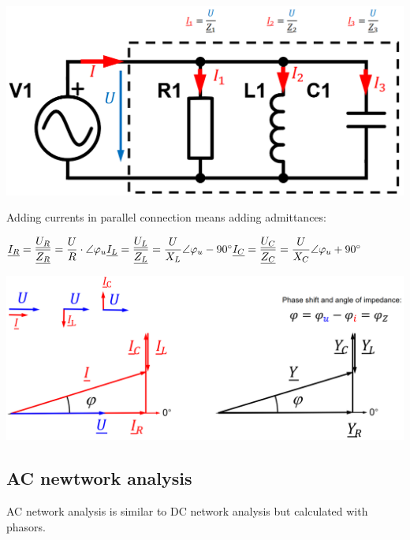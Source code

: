 \documentclass{article}
\begin{document}
\begin{center}
    \includegraphics[width=.5\textwidth]{media/parallel_impedances.png}
\end{center}

\newpage
Adding currents in parallel connection means adding admittances:

$\underline{I_R} = \dfrac{\underline{U_R}}{\underline{Z_R}} = \dfrac{U}{R}\cdot\angle\varphi_u\\\\\\
\underline{I_L} = \dfrac{\underline{U_L}}{\underline{Z_L}} = \dfrac{U}{X_L}\angle\varphi_u -90^{\circ}\\\\\\
\underline{I_C} = \dfrac{\underline{U_C}}{\underline{Z_C}} = \dfrac{U}{X_C}\angle\varphi_u +90^{\circ}$
\begin{center}
    \includegraphics[width=.8\textwidth]{media/current_admittance.png}
\end{center}

\subsection{AC newtwork analysis}
AC network analysis is similar to DC network analysis but calculated with phasors.
\end{document}
